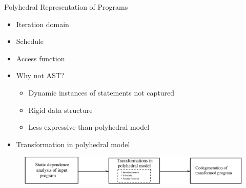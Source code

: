 \documentclass{beamer}
\begin{document}
\begin{frame}{Polyhedral Representation of Programs}
\begin{itemize}
\item Iteration domain
\item Schedule
\item Access function
\end{itemize}

\pause
{}

\pause
\begin{itemize}
\item Why not AST?
	\begin{itemize}
	\item Dynamic instances of statements not captured
	\item Rigid data structure
	\item Less expressive than polyhedral model
	\end{itemize}

\pause	
\item Transformation in polyhedral model 
\end{itemize}
\begin{figure}
\begin{center}
  \includegraphics[width=1\textwidth]{images/poly_steps.eps}
  \label{fig:iter1}
\end{center}  
\end{figure}

\end{frame}
\end{document}
